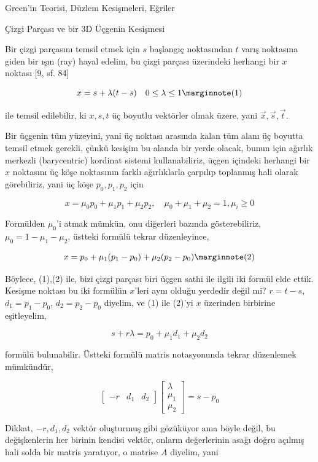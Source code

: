 \documentclass[12pt,fleqn]{article}\usepackage{../../common}
\begin{document}
Green'in Teorisi, Düzlem Kesişmeleri, Eğriler

Çizgi Parçası ve bir 3D Üçgenin Kesişmesi

Bir çizgi parçasını temsil etmek için $s$ başlangıç noktasından $t$ varış
noktasına giden bir ışın (ray) hayal edelim, bu çizgi parçası üzerindeki
herhangi bir $x$ noktası [9, sf. 84]

$$
x = s + \lambda (t-s) \quad 0 \le \lambda \le 1
\mlabel{1}
$$

ile temsil edilebilir, ki $x,s,t$ üç boyutlu vektörler olmak üzere, yani
$\vec{x},\vec{s},\vec{t}$.

Bir üçgenin tüm yüzeyini, yani üç noktası arasında kalan tüm alanı üç boyutta
temsil etmek gerekli, çünkü kesişim bu alanda bir yerde olacak, bunun için
ağırlık merkezli (barycentric) kordinat sistemi kullanabiliriz, üçgen içindeki
herhangi bir $x$ noktasını üç köşe noktasının farklı ağırlıklarla çarpılıp
toplanmış hali olarak görebiliriz, yani üç köşe $p_0,p_1,p_2$ için

$$
x = \mu_0 p_0 + \mu_1 p_1 + \mu_2 p_2,
\quad \mu_0 + \mu_1 + \mu_2 = 1, \mu_i \ge 0
$$

Formülden $\mu_0$'i atmak mümkün, onu diğerleri bazında gösterebiliriz,
$\mu_0 = 1-\mu_1-\mu_2$, üstteki formülü tekrar düzenleyince,

$$
x = p_0 + \mu_1 (p_1 - p_0) + \mu_2 (p_2 - p_0)
\mlabel{2}
$$

Böylece, (1),(2) ile, bizi çizgi parçası biri üçgen sathi ile ilgili iki
formül elde ettik. Kesişme noktası bu iki formülün $x$'leri aynı olduğu
yerdedir değil mi? $r=t-s$, $d_1=p_1-p_0$, $d_2 = p_2-p_0$ diyelim,
ve (1) ile (2)'yi $x$ üzerinden birbirine eşitleyelim,

$$
s + r\lambda = p_0 + \mu_1 d_1 + \mu_2 d_2
$$

formülü bulunabilir. Üstteki formülü matris notasyonunda tekrar düzenlemek
mümkündür,

$$
[\begin{array}{ccc} -r & d_1 & d_2 \end{array}]
\left[\begin{array}{ccc}
\lambda \\ \mu_1 \\ \mu_2 
\end{array}\right] = s - p_0
$$

Dikkat, $-r,d_1,d_2$ vektör oluşturmuş gibi gözüküyor ama böyle değil, bu
değişkenlerin her birinin kendisi vektör, onların değerlerinin asağı doğru
açılmış hali solda bir matris yaratıyor, o matrise $A$ diyelim, yani
\end{document}
